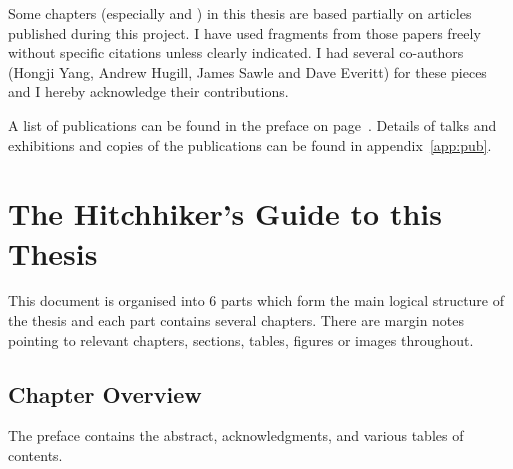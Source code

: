 Some chapters (especially  and ) in this thesis are based partially on articles published during this project. I have used fragments from those papers freely without specific citations unless clearly indicated. I had several co-authors (Hongji Yang, Andrew Hugill, James Sawle and Dave Everitt) for these pieces and I hereby acknowledge their contributions.

A list of publications can be found in the preface on page~\pageref{pre:pub}. Details of talks and exhibitions and copies of the publications can be found in appendix~\ref{app:pub}.


\section{The Hitchhiker's Guide to this Thesis}

This document is organised into \num{6} parts which form the main logical structure of the thesis and each part contains several chapters. There are margin notes pointing to relevant chapters, sections, tables, figures or images throughout.


\subsection{Chapter Overview}

The preface contains the abstract, acknowledgments, and various tables of contents.

